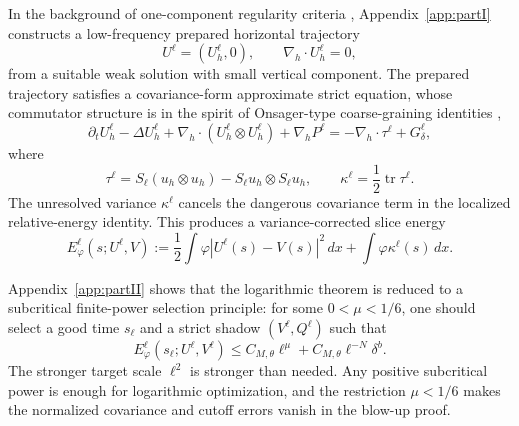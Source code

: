 \documentclass[11pt]{article}
\numberwithin{equation}{section}
\theoremstyle{plain}
\theoremstyle{definition}
\theoremstyle{remark}
\newcommand{\tr}{\operatorname{tr}}
\newcommand{\dx}{\,dx}
\newcommand{\nabh}{\nabla_h}
\newcommand{\divh}{\nabla_h\!\cdot}
\begin{document}
In the background of one-component regularity criteria \cite{CheminZhang2016,CheminZhangZhang2017,HanLeiLiZhao2019,KangNguyen2023}, Appendix~\ref{app:partI} constructs a low-frequency prepared horizontal trajectory
\[
        U^\ell=(U_h^\ell,0),
        \qquad
        \divh U_h^\ell=0,
\]
from a suitable weak solution with small vertical component.  The prepared trajectory
satisfies a covariance-form approximate strict equation, whose commutator structure is in the spirit of Onsager-type coarse-graining identities \cite{ConstantinETiti1994},
\begin{equation}\label{pIII:eq:prepared-equation-intro}
        \partial_tU_h^\ell-
        \Delta U_h^\ell
        +\nabh\cdot(U_h^\ell\otimes U_h^\ell)
        +\nabh P^\ell
        =
        -\nabh\cdot\tau^\ell+G_\delta^\ell,
\end{equation}
where
\[
        \tau^\ell=S_\ell(u_h\otimes u_h)-S_\ell u_h\otimes S_\ell u_h,
        \qquad
        \kappa^\ell=\frac12\tr\tau^\ell.
\]
The unresolved variance \(\kappa^\ell\) cancels the dangerous covariance term in the
localized relative-energy identity.  This produces a variance-corrected slice energy
\begin{equation}\label{pIII:eq:buffered-energy-intro}
        E_\varphi^\ell(s;U^\ell,V)
        :=
        \frac12\int \varphi |U^\ell(s)-V(s)|^2\dx
        +\int\varphi\kappa^\ell(s)\dx .
\end{equation}

Appendix~\ref{app:partII} shows that the logarithmic theorem is reduced to a subcritical finite-power
selection principle: for some \(0<\mu<1/6\), one should select a good time \(s_\ell\)
and a strict shadow \((V^\ell,Q^\ell)\) such that
\begin{equation}\label{pIII:eq:finite-power-selection-intro}
        E_\varphi^\ell(s_\ell;U^\ell,V^\ell)
        \le
        C_{M,\theta}\ell^\mu+C_{M,\theta}\ell^{-N}\delta^b.
\end{equation}
The stronger target scale \(\ell^2\) is stronger than needed.  Any positive subcritical
power is enough for logarithmic optimization, and the restriction \(\mu<1/6\) makes
the normalized covariance and cutoff errors vanish in the blow-up proof.
\end{document}

